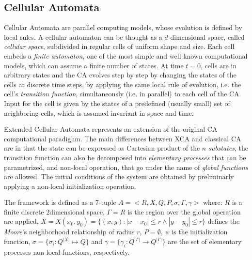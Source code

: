 \subsection{Cellular Automata}\label{sec:CA}
    Cellular Automata are parallel computing models, whose evolution
    is defined by local rules. A cellular automaton can be thought as
    a $d$-dimensional space, called \emph{cellular space}, subdivided
    in regular cells of uniform shape and size. Each cell embeds a
    \emph{finite automaton}, one of the most simple and well known
    computational models, which can assume a finite number of
    states. At time $t=0$, cells are in arbitrary states and the CA
    evolves step by step by changing the states of the cells at
    discrete time steps, by applying the same local rule of evolution,
    i.e. the cell's \emph{transition function}, simultaneously
    (i.e. in parallel) to each cell of the CA. Input for the cell is
    given by the states of a predefined (usually small) set of
    neighboring cells, which is assumed invariant in space and time.
 
 Extended Cellular Automata\cite{DiGregorio&Serra-1999}  represents an extension of the original CA computational paradighm.   
    The main differences between XCA and classical CA are in that the state can be expressed as Cartesian product of the $n$ 
    \emph{substates}, the transition function can also be decomposed into \textit{elementary processes} that can be parametrized,
    and non-local operation, that go under the name of \textit{global functions} are allowed.
        The initial conditions of the system are obtained by preliminarly
    applying a non-local initialization operation.
    

    The framework is defined as a 7-tuple $ A = <R,X,Q,P,\sigma,\Gamma,\gamma>$ where:    
    $R$ is a finite discrete $2$dimensional space, $\Gamma=R$ is the region over the global operation are applied,
    $X=X(x_0,y_0)=\{(x,y): \left| x-x_0\right| \leq r \wedge \left| y-y_0\right| \leq r\} $ defines the \textit{Moore}'s neighborhood relationship of radius $r$, $P=\emptyset$, $\psi$ is the initialization function, $\sigma=\{\sigma_i:Q^{|X|} \mapsto Q\}$ and   $\gamma= \{\gamma_i:Q^{|\Gamma|} \rightarrow Q^{|\Gamma|}\} $ are the set of  elementary processes non-local functions, respectively.
    

